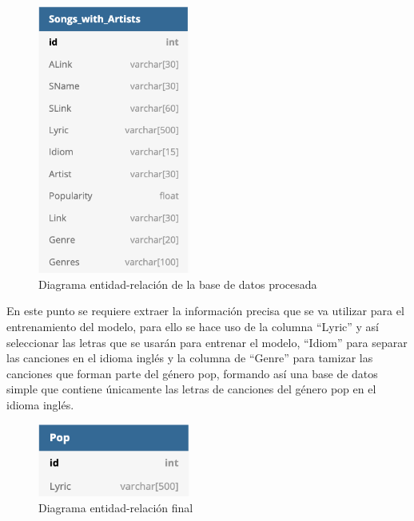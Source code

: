 \documentclass[12pt, a4paper, titlepage]{article}
\begin{document}
	\begin{figure}[H]
		\includegraphics[width=5cm]{./Imagenes/BasedeDatos/Songs_with_Artists.png}
		\centering 
		\caption{Diagrama entidad-relación de la base de datos procesada}
	\end{figure}
	En este punto se requiere extraer la información precisa que se va utilizar para el entrenamiento del modelo, para ello se hace uso de la columna “Lyric” y así seleccionar las letras que se usarán para entrenar el modelo, “Idiom” para separar las canciones en el idioma inglés y la columna de “Genre” para tamizar las canciones que forman parte del género pop, formando así una base de datos simple que contiene únicamente las letras de canciones del género pop en el idioma inglés.
	\begin{figure}[H]
		\includegraphics[width=5cm]{./Imagenes/BasedeDatos/Pop.png}
		\centering 
		\caption{Diagrama entidad-relación final}
	\end{figure}
	\newpage
\end{document}
